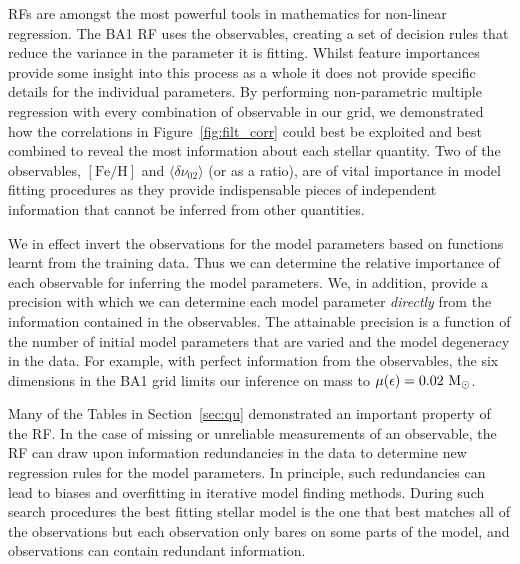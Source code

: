 RFs are amongst the most powerful tools in mathematics for non-linear regression. 
The BA1 RF uses the observables, creating a set of decision rules that reduce the variance in the parameter it is fitting.
Whilst feature importances provide some insight into this process as a whole it does not provide specific details for the individual parameters. 
By performing non-parametric multiple regression with every combination of observable in our grid,  
we demonstrated how the correlations in Figure~\ref{fig:filt_corr} could best be exploited and best combined to reveal the most information about each stellar quantity.
Two of the observables, ${[\text{Fe/H}]}$ and ${\langle\delta\nu_{02}\rangle}$ (or as a ratio),  are of vital importance in model fitting procedures as they provide indispensable pieces of independent information that cannot be inferred from other quantities.  

We in effect invert the observations for the model parameters based on functions learnt from the training data. 
Thus we can determine the relative importance of each observable for inferring the model parameters. We, in addition, provide a precision with which we can determine each model parameter \emph{directly} from the information contained in the observables. 
The attainable precision is a function of the number of initial model parameters that are varied and the model degeneracy in the data. 
For example, with perfect information from the observables, the six dimensions in the BA1 grid limits our inference on mass to 
${\mu (\epsilon) =0.02 \ \Mo}$. 


Many of the Tables in Section~\ref{sec:qu} demonstrated an important property of the RF. 
In the case of missing or unreliable measurements of an observable, the RF can draw upon information redundancies in the data to determine new regression rules for the model parameters.
In principle, such redundancies can lead to biases and overfitting in iterative model finding methods.
During such search procedures the best fitting stellar model is the one that best matches all of the observations but each observation only bares on some parts of the model, and observations can contain redundant information.



